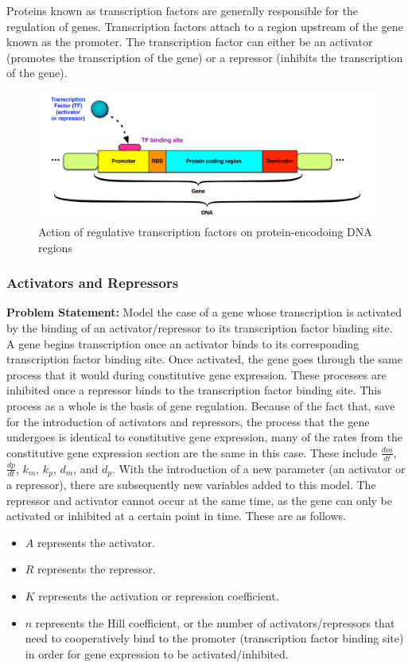 Proteins known as transcription factors are generally responsible for the regulation of genes.
Transcription factors attach to a region upstream of the gene known as the promoter.
The transcription factor can either be an activator (promotes the transcription of the gene) or a repressor (inhibits the transcription of the gene). 

\begin{figure}[h]
    \centering
    \includegraphics[width=.5\textwidth]{pictures/diffeq/img3.png}
    \caption{Action of regulative transcription factors on protein-encodoing DNA regions}
\end{figure}

\subsubsection{Activators and Repressors}

\textbf{Problem Statement: } Model the case of a gene whose transcription is activated by the binding of an activator/repressor to its transcription factor binding site.\\

A gene begins transcription once an activator binds to its corresponding transcription factor binding site.
Once activated, the gene goes through the same process that it would during constitutive gene expression.
These processes are inhibited once a repressor binds to the transcription factor binding site.
This process as a whole is the basis of gene regulation.
Because of the fact that, save for the introduction of activators and repressors, the process that the gene undergoes is identical to constitutive gene expression, many of the rates from the constitutive gene expression section are the same in this case.
These include $\frac{dm}{dt}$, $\frac{dp}{dt}$, $k_{m}$, $k_{p}$, $d_{m}$, and $d_{p}$.
With the introduction of a new parameter (an activator or a repressor), there are subsequently new variables added to this model.
The repressor and activator cannot occur at the same time, as the gene can only be activated or inhibited at a certain point in time.
These are as follows.

\begin{itemize}
    \item $A$ represents the activator.
    \item $R$ represents the repressor.
    \item $K$ represents the activation or repression coefficient.
    \item $n$ represents the Hill coefficient, or the number of activators/repressors that need to cooperatively bind to the promoter (transcription factor binding site) in order for gene expression to be activated/inhibited.
\end{itemize}

